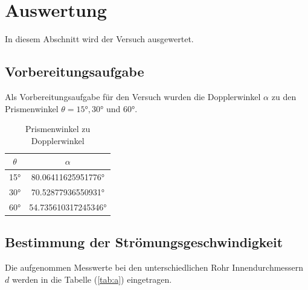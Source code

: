 \newpage
\section{Auswertung}

In diesem Abschnitt wird der Versuch ausgewertet.

\subsection{Vorbereitungsaufgabe}
Als Vorbereitungsaufgabe für den Versuch wurden die Dopplerwinkel $\alpha$ zu den Prismenwinkel $\theta = 15° , 30°$ und $60°$.

\begin{table}
    \centering
    \caption{Prismenwinkel zu Dopplerwinkel}
    \begin{tabular}{c c}
        \toprule
        {$\theta$} & {$\alpha$}  \\
        \midrule
        15° & 80.06411625951776°  \\
        30° & 70.52877936550931°  \\
        60° & 54.735610317245346°  \\
        \bottomrule
    \end{tabular}
    \label{tab:vor}
\end{table}

\subsection{Bestimmung der Strömungsgeschwindigkeit}

Die aufgenommen Messwerte bei den unterschiedlichen Rohr Innendurchmessern $d$ werden in die Tabelle (\ref{tab:a}) eingetragen.

